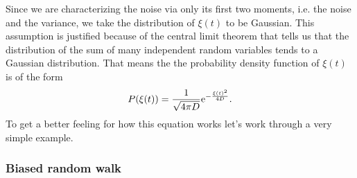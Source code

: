 Since we are characterizing the noise via only its first two moments, i.e. the
noise and the variance, we take the distribution of $\xi(t)$ to be Gaussian.
This assumption is justified because of the central limit theorem that tells us
that the distribution of the sum of many independent random variables tends to
a Gaussian distribution. That means the the probability density function of
$\xi(t)$ is of the form
\begin{equation}
  P(\xi(t)) = {1 \over \sqrt{4 \pi D}} 
  \mathrm{e}^{- {\xi(t)^2 \over 4D}}.
\end{equation}
To get a better feeling for how this equation works let's work through a very
simple example.

\subsubsection{Biased random walk}

